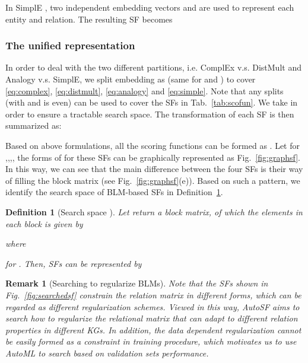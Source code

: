 \documentclass[conference]{IEEEtran}
\newtheorem{definition}{Definition}
\newtheorem{remark}{Remark}[section]
\begin{document}
{In SimplE \cite{kazemi2018simple}, 
two independent embedding vectors  and 
are used to represent each entity and relation.
The resulting SF becomes



\subsubsection{The unified representation}
In order to deal with the two different partitions,
i.e. ComplEx v.s. DistMult 
and Analogy v.s. SimplE,
we split embedding 
 as 
(same for  and )
to cover \eqref{eq:complex}, \eqref{eq:distmult}, \eqref{eq:analogy} and \eqref{eq:simple}.
Note that any splits  (with  and  is even) can be used to cover the SFs in Tab.~\ref{tab:scofun}.
We take  in order to ensure a tractable search space.
The transformation of each SF is then summarized as:
{
\small

}

\vspace{-10px}

Based on above formulations,
all the scoring functions can be formed as .
Let  for ,,,,
the forms of   for these SFs can be graphically represented as Fig.~\ref{fig:graphsf}.
In this way, we can see that the main difference between the four SFs is 
their way of filling the  block
matrix (see Fig.~\ref{fig:graphsf}(e)).
Based on such a pattern,
we identify
the search space of BLM-based SFs in Definition~\ref{def:unify}.

}





\begin{definition}[Search space ] \label{def:unify}
Let  return
a  block matrix,
of which the elements in each block is given by 

where 

for .
Then,
SFs can be represented by

\end{definition}


\begin{remark}[Searching to regularize BLMs]
\label{rmk:reg}
Note that the SFs shown in Fig.~\ref{fig:searchedsf} constrain the relation matrix  in different forms,
which can be regarded as different regularization schemes.
Viewed in this way, AutoSF aims to search how to regularize the relational matrix 
that can adapt to different relation properties in different  KGs.
In addition,
the data dependent regularization cannot be easily formed as a constraint in training procedure,
which motivates us to use AutoML to search based on validation sets performance.
\end{remark}
\end{document}
